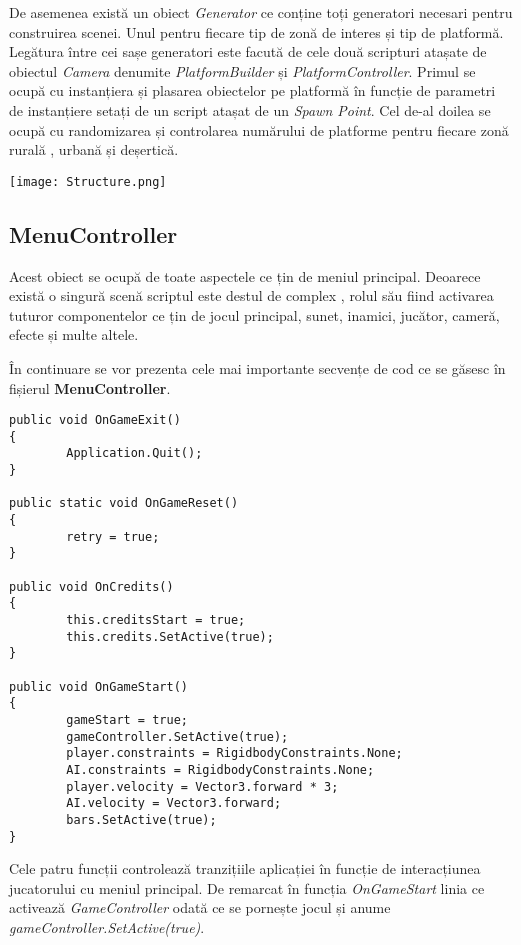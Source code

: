 De asemenea există un obiect \textit{Generator} ce conține toți generatori necesari pentru construirea scenei. Unul pentru fiecare tip de zonă de interes și tip de platformă. Legătura între cei sașe generatori este facută de cele două scripturi atașate de obiectul \textit{Camera} denumite \textit{PlatformBuilder} și \textit{PlatformController}. Primul se ocupă cu instanțiera și plasarea obiectelor pe platformă în funcție de parametri de instanțiere setați de un script atașat de un \textit{Spawn Point}. Cel de-al doilea se ocupă cu randomizarea și controlarea numărului de platforme pentru fiecare zonă rurală , urbană și deșertică.\par
\par
\texttt{[image: Structure.png]} \par

\subsection{MenuController}

Acest obiect se ocupă de toate aspectele ce țin de meniul principal. Deoarece există o singură scenă scriptul este destul de complex , rolul său fiind activarea tuturor componentelor ce țin de jocul principal, sunet, inamici, jucător, cameră, efecte și multe altele.\par

În continuare se vor prezenta cele mai importante secvențe de cod ce se găsesc în fișierul \textbf{MenuController}.\par

\begin{lstlisting}[caption=Funcțiile din MenuController]
public void OnGameExit()
{
        Application.Quit();
}

public static void OnGameReset()
{
        retry = true;
}

public void OnCredits()
{
        this.creditsStart = true;
        this.credits.SetActive(true);
}

public void OnGameStart()
{
        gameStart = true;
        gameController.SetActive(true);
        player.constraints = RigidbodyConstraints.None;
        AI.constraints = RigidbodyConstraints.None;
        player.velocity = Vector3.forward * 3;
        AI.velocity = Vector3.forward;
        bars.SetActive(true);
}
\end{lstlisting}

Cele patru funcții controlează tranzițiile aplicației în funcție de interacțiunea jucatorului cu meniul principal. De remarcat în funcția \textit{OnGameStart} linia ce activează \textit{GameController} odată ce se pornește jocul și anume \textit{gameController.SetActive(true)}.\par

